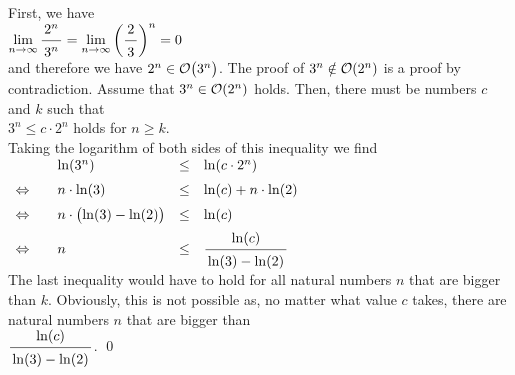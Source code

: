 \proof
 First, we have \\[0.2cm]
\hspace*{1.3cm} 
$\displaystyle\lim\limits_{n \rightarrow \infty} \bruch{2^n}{3^n} = 
 \lim\limits_{n \rightarrow \infty} \left(\bruch{2}{3}\right)^n = 0$
\\[0.2cm]
and therefore we have $2^n \in \mathcal{O}\bigl(3^n\bigr)$.  The proof of $3^n \notin \mathcal{O}(2^n)$ is a proof
by contradiction.  Assume that 
$3^n \in \mathcal{O}(2^n)$ holds.  Then, there must be numbers $c$ and $k$ such that 
\\[0.2cm]
\hspace*{1.3cm}
$3^n \leq c \cdot 2^n$ \quad holds for $n \geq k$. 
\\[0.2cm]
Taking the logarithm of both sides of this inequality we find 
\\[0.2cm]
\hspace*{1.3cm}
$
\begin{array}{llcl}
                & \ln(3^n) & \leq & \ln(c \cdot 2^n) \\[0.2cm]
\Leftrightarrow\quad &  n \cdot \ln(3) & \leq & \ln(c) + n \cdot \ln(2) \\[0.2cm]
\Leftrightarrow &  n \cdot \bigl(\ln(3) - \ln(2)\bigr) & \leq & \ln(c)  \\[0.2cm]
\Leftrightarrow &  n  & \leq & \bruch{\ln(c)}{\ln(3) - \ln(2)}          \\[0.2cm]
\end{array}
$
\\[0.2cm]
The last inequality would have to hold for all natural numbers $n$ that are bigger than $k$.  Obviously,
this is not possible as, no matter what value $c$ takes, there are natural numbers $n$ that are bigger than 
\\[0.2cm]
\hspace*{1.3cm}
$\bruch{\ln(c)}{\ln(3) - \ln(2)}$.
\qed
\pagebreak

